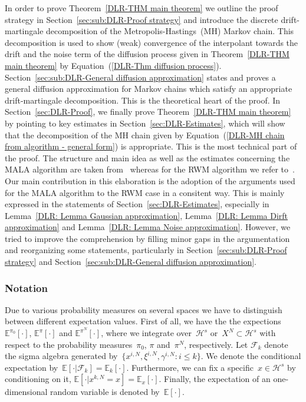 In order to prove Theorem~\ref{DLR-THM main theorem} we outline the proof strategy in Section~\ref{sec:sub:DLR-Proof strategy} and introduce the discrete drift-martingale decomposition of the Metropolis-Hastings~(MH) Markov chain. This decomposition is used to show (weak) convergence of the interpolant towards the drift and the noise term of the diffusion process given in Theorem~\ref{DLR-THM main theorem} by Equation~(\ref{DLR-Thm diffusion process}). Section~\ref{sec:sub:DLR-General diffusion approximation} states and proves a general diffusion approximation for Markov chains which satisfy an appropriate drift-martingale decomposition. This is the theoretical heart of the proof. In Section~\ref{sec:DLR-Proof}, we finally prove Theorem~\ref{DLR-THM main theorem} by pointing to key estimates in Section~\ref{sec:DLR-Estimates}, which will show that the decomposition of the MH chain given by Equation~(\ref{DLR-MH chain from algorithm - general form}) is appropriate. This is the most technical part of the proof. The structure and main idea as well as the estimates concerning the MALA algorithm are taken from~\autocite{Pillai2012} whereas for the RWM algorithm we refer to~\autocite{Mattingly2010}. Our main contribution in this elaboration is the adoption of the arguments used for the MALA algorithm to the RWM case in a consitent way. This is mainly expressed in the statements of Section~\ref{sec:DLR-Estimates}, especially in Lemma~\ref{DLR: Lemma Gaussian approximation}, Lemma~\ref{DLR: Lemma Dirft approximation} and Lemma~\ref{DLR: Lemma Noise approximation}. However, we tried to improve the comprehension by filling minor gaps in the argumentation and reorganizing some statements, particularly in Section~\ref{sec:sub:DLR-Proof strategy} and Section~\ref{sec:sub:DLR-General diffusion approximation}.

\subsubsection*{Notation}

Due to various probability measures on several spaces we have to distinguish between different expectation values. First of all, we have the the expections~$\mathbb{E}^{\pi_0}[\cdot]$, $\mathbb{E}^{\pi}[\cdot]$ and $\mathbb{E}^{\pi^N}[\cdot]$, where we integrate over~$\mathcal{H}^s$ or~$X^N \subset \mathcal{H}^s$ with respect to the probability measures~$\pi_0$, $\pi$ and~$\pi^N$, respectively. Let $\mathcal{F}_k$ denote the sigma algebra generated by~$\{ x^{i,N}, \xi^{i,N}, \gamma^{i,N} : i \leq k  \}$. We denote the conditional expectation by~$\mathbb{E}[\cdot|\mathcal{F}_k] = \mathbb{E}_k [\cdot]$. Furthermore, we can fix a specific~$x \in \mathcal{H}^s$ by conditioning on it, $\mathbb{E}[\cdot | x^{k,N} = x] = \mathbb{E}_x[\cdot]$. Finally, the expectation of an one-dimensional random variable is denoted by~$\mathbb{E}[\cdot]$.



